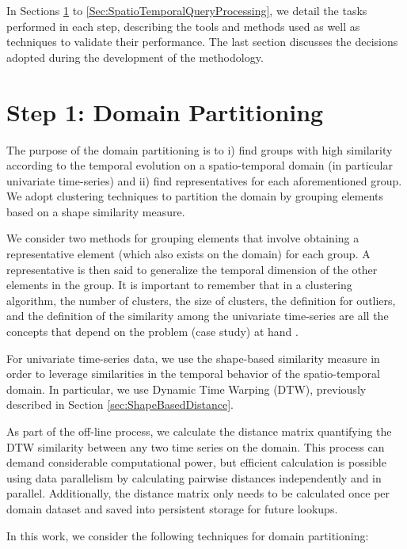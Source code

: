 In Sections \ref{Sec:DomainPartitioning} to \ref{Sec:SpatioTemporalQueryProcessing}, we detail the tasks performed in each step, describing the tools and methods used as well as techniques to validate their performance. The last section discusses the decisions adopted during the development of the methodology.

\section{Step 1: Domain Partitioning}
\label{Sec:DomainPartitioning}

The purpose of the domain partitioning is to i) find groups with high similarity according to the temporal evolution on a spatio-temporal domain (in particular univariate time-series) and ii) find representatives for each aforementioned group. We adopt clustering techniques to partition the domain by grouping elements based on a shape similarity measure. 

We consider two methods for grouping elements that involve obtaining a representative element (which also exists on the domain) for each group. A representative is then said to generalize the temporal dimension of the other elements in the group. It is important to remember that in a clustering algorithm, the number of clusters, the size of clusters, the definition for outliers, and the definition of the similarity among the univariate time-series are all the concepts that depend on the problem (case study) at hand \cite{Aghabozorgi2015}.

For univariate time-series data, we use the shape-based similarity measure in order to leverage similarities in the temporal behavior of the spatio-temporal domain. In particular, we use Dynamic Time Warping (DTW), previously described in Section \ref{sec:ShapeBasedDistance}.

As part of the off-line process, we calculate the distance matrix quantifying the DTW similarity between any two time series on the domain. This process can demand considerable computational power, but efficient calculation is possible using data parallelism by calculating pairwise distances independently and in parallel. Additionally, the distance matrix only needs to be calculated once per domain dataset and saved into persistent storage for future lookups.

In this work, we consider the following techniques for domain partitioning:

